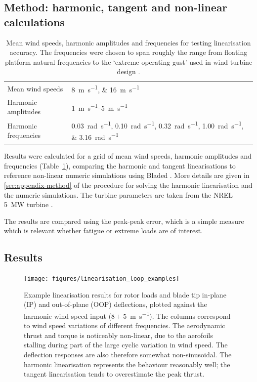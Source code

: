 \documentclass[preprint]{elsarticle}
\begin{document}
\subsection{Method: harmonic, tangent and non-linear calculations}

\begin{table}
  \centering
  \caption{Mean wind speeds, harmonic amplitudes and frequencies for testing
    linearisation accuracy. The frequencies were chosen to span roughly the
    range from floating platform natural frequencies to the `extreme operating
    gust' used in wind turbine design \citep{IEC_ed3}.}
  \label{tab:test-grid}
  \begin{tabular}{ll}
    \toprule
    Mean wind speeds & \SIlist{8;16}{\meter\per\second} \\
    Harmonic amplitudes & \SIrange{1}{5}{\meter\per\second} \\
    Harmonic frequencies & \SIlist{0.03;0.10;0.32;1.00;3.16}{\radian\per\second} \\
    \bottomrule
  \end{tabular}
\end{table}

Results were calculated for a grid of mean wind speeds, harmonic amplitudes and
frequencies (Table~\ref{tab:test-grid}), comparing the harmonic and tangent
linearisations to reference non-linear numeric simulations using Bladed
\citep{GarradHassan2011}. More details are given in \ref{sec:appendix-method} of
the procedure for solving the harmonic linearisation and the numeric
simulations. The turbine parameters are taken from the NREL \SI{5}{\mega\watt}
turbine \citep{Jonkman2009b}.

The results are compared using the peak-peak error, which is a simple measure
which is relevant whether fatigue or extreme loads are of interest.

\subsection{Results}
\label{sec:aero-results}

\begin{figure}
  \centering
  \hspace*{-1.5cm}\texttt{[image: figures/linearisation\_loop\_examples]}
  \caption{Example linearisation results for rotor loads and blade tip in-plane
    (IP) and out-of-plane (OOP) deflections, plotted against the harmonic wind
    speed input ($8 \pm 5$~\si{\metre\per\second}). The columns correspond to
    wind speed variations of different frequencies. The aerodynamic thrust and
    torque is noticeably non-linear, due to the aerofoils stalling during part of
    the large cyclic variation in wind speed. The deflection responses are also
    therefore somewhat non-sinusoidal. The harmonic linearisation represents the
    behaviour reasonably well; the tangent linearisation tends to overestimate
    the peak thrust.}
\label{fig:hlin-example-loops}
\end{figure}
\end{document}
